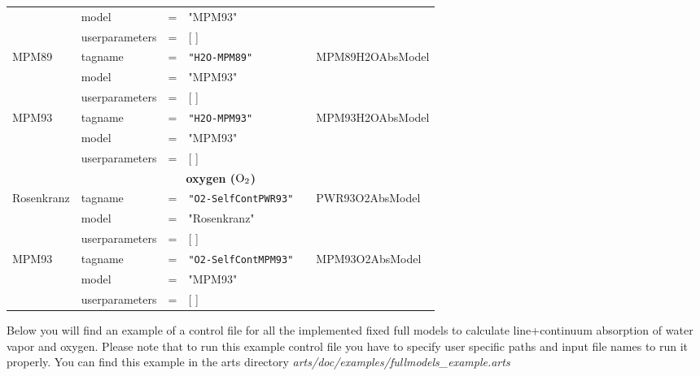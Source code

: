 \begin{landscape}
\begin{longtable}{llllll}
             & model &=& "MPM93" &   &  \\ 
             & userparameters &=& [ ] &   & \\
 MPM89       & tagname &=& {\tt "H2O-MPM89"}   & \cite{liebe:89} & MPM89H2OAbsModel\\
             & model &=& "MPM93" &   &  \\ 
             & userparameters &=& [ ] &   & \\
 MPM93       & tagname &=& {\tt "H2O-MPM93"}   & \cite{liebeetal:93} & MPM93H2OAbsModel\\
             & model &=& "MPM93" &   &  \\ 
             & userparameters &=& [ ] &   & \\
 \hline
 \multicolumn{6}{c}{{\bf oxygen ($\mbox{O}_2$)}}\\
 \hline
 Rosenkranz  & tagname &=& {\tt "O2-SelfContPWR93"} & \cite{pwr:93} & PWR93O2AbsModel\\
             & model &=& "Rosenkranz" &   &  \\ 
             & userparameters &=& [ ] &   & \\
 MPM93       & tagname &=& {\tt "O2-SelfContMPM93"} & \cite{liebeetal:93} & MPM93O2AbsModel\\
             & model &=& "MPM93" &   &  \\ 
             & userparameters &=& [ ] &   & \\
 \hline
 \end{longtable}
 \setlength{\LTcapwidth}{0.8\textwidth}
\end{landscape}






\label{leveld:ArtsFullModelExampleControlFile}
Below you will find an example of a control file for all 
the implemented fixed full models to calculate line+continuum
absorption of water vapor and oxygen. Please note that to 
run this example control file you have to specify user 
specific paths and input file names to run it properly. 
You can find this example in the arts directory 
{\it arts/doc/examples/fullmodels\_example.arts}


